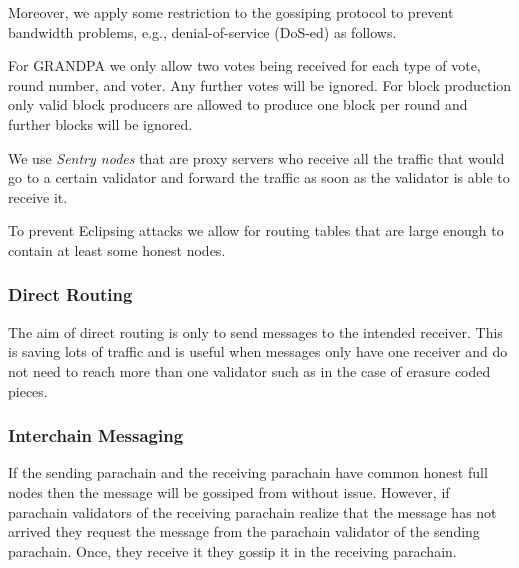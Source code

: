Moreover, we apply some restriction to the gossiping protocol to prevent bandwidth problems, e.g., denial-of-service (DoS-ed) as follows.

For GRANDPA we only allow two votes being received for each type of vote, round number, and voter. Any further votes will be ignored.
For block production only valid block producers are allowed to produce one block per round and further blocks will be ignored.

We use \emph{Sentry nodes} that are proxy servers who receive all the traffic that would go to a certain validator and forward the traffic as soon as the validator is able to receive it.

To prevent Eclipsing attacks \cite{} we allow for routing tables that are large enough to contain at least some honest nodes.

\subsubsection{Direct Routing}
The aim of direct routing is only to send messages to the intended receiver.
This is saving lots of traffic and is useful when messages only have one receiver and do not need to reach more than one validator such as in the case of erasure coded pieces.

\subsubsection{Interchain Messaging}
If the sending parachain and the receiving parachain have common honest full nodes then the message will be gossiped from without issue.
However, if parachain validators of the receiving parachain realize that the message has not arrived they request the message from the parachain validator of the sending parachain.
Once, they receive it they gossip it in the receiving parachain.
